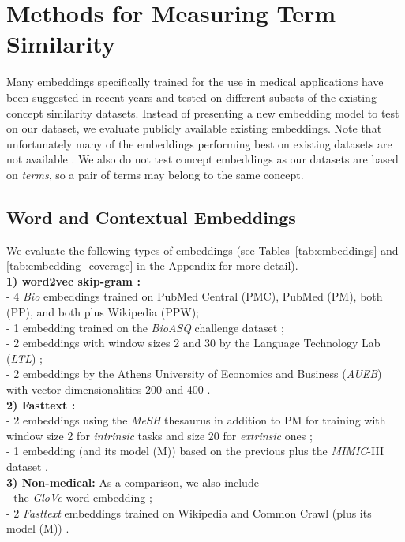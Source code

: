 \documentclass[letterpaper]{article} %
\begin{document}
\section{Methods for Measuring Term Similarity}
Many embeddings specifically trained for the use in medical applications have been suggested in recent years and tested on different subsets of the existing concept similarity datasets. Instead of presenting a new embedding model to test on our dataset, we evaluate publicly available existing embeddings. Note that unfortunately many of the embeddings performing best on existing datasets are not available \cite{LingEtAl2017,HenryCM2018}.
We also do not test concept embeddings as our datasets are based on \emph{terms}, so a pair of terms may belong to the same concept.

\subsection{Word and Contextual Embeddings}

We evaluate the following types of embeddings (see Tables~\ref{tab:embeddings} and \ref{tab:embedding_coverage} in the Appendix for more detail).\\
 \textbf{1)  word2vec skip-gram \cite{MikolovEtAl2013}:} \\
 \indent - 4 \emph{Bio} embeddings \cite{PyysaloEtAl2013} trained on PubMed Central (PMC), PubMed (PM), both (PP), and both plus Wikipedia (PPW);\\
 \indent - 1 embedding trained on the \emph{BioASQ} challenge dataset \cite{KosmopoulosAP2015};\\
 \indent - 2 embeddings with window sizes 2 and 30 by the Language Technology Lab (\emph{LTL}) \cite{ChiuEtAl2016};\\
 \indent - 2 embeddings by the
 Athens University of Economics and Business (\emph{AUEB}) with vector dimensionalities 200 and 400 \cite{McdonaldEtAl2018}.\\
 \textbf{2) Fasttext \cite{BojanowskiGJM2017}:}\\
 \indent - 2 embeddings using the \emph{MeSH} thesaurus in addition to PM for training with window size 2 for \emph{intrinsic} tasks and size 20 for \emph{extrinsic} ones \cite{ZhangEtAl2019};\\
 \indent - 1 embedding (and its model (M)) based on the previous plus the \emph{MIMIC}-III dataset \cite{ChenPL2019}. \\
 \textbf{3) Non-medical:} As a comparison, we also include \\
 \indent - the \emph{GloVe} word embedding \cite{PenningtonEtAl2014}; \\
 \indent - 2 \emph{Fasttext} embeddings trained on Wikipedia and Common Crawl (plus its model (M)) \cite{MikolovEtAl2018}.
\end{document}
